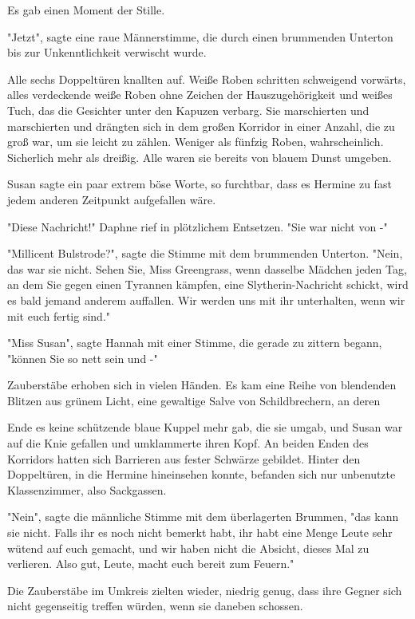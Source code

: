 {Es gab einen Moment der Stille.

"Jetzt", sagte eine raue Männerstimme, die durch einen brummenden Unterton bis zur Unkenntlichkeit verwischt wurde.

Alle sechs Doppeltüren knallten auf. Weiße Roben schritten schweigend vorwärts, alles verdeckende weiße Roben ohne Zeichen der Hauszugehörigkeit und weißes Tuch, das die Gesichter unter den Kapuzen verbarg. Sie marschierten und marschierten und drängten sich in dem großen Korridor in einer Anzahl, die zu groß war, um sie leicht zu zählen. Weniger als fünfzig Roben, wahrscheinlich. Sicherlich mehr als dreißig. Alle waren sie bereits von blauem Dunst umgeben.

Susan sagte ein paar extrem böse Worte, so furchtbar, dass es Hermine zu fast jedem anderen Zeitpunkt aufgefallen wäre.

"Diese Nachricht!" Daphne rief in plötzlichem Entsetzen. "Sie war nicht von -"

"Millicent Bulstrode?", sagte die Stimme mit dem brummenden Unterton. "Nein, das war sie nicht. Sehen Sie, Miss Greengrass, wenn dasselbe Mädchen jeden Tag, an dem Sie gegen einen Tyrannen kämpfen, eine Slytherin-Nachricht schickt, wird es bald jemand anderem auffallen. Wir werden uns mit ihr unterhalten, wenn wir mit euch fertig sind."

"Miss Susan", sagte Hannah mit einer Stimme, die gerade zu zittern begann, "können Sie so nett sein und -"

Zauberstäbe erhoben sich in vielen Händen. Es kam eine Reihe von blendenden Blitzen aus grünem Licht, eine gewaltige Salve von Schildbrechern, an deren

Ende es keine schützende blaue Kuppel mehr gab, die sie umgab, und Susan war auf die Knie gefallen und umklammerte ihren Kopf. An beiden Enden des Korridors hatten sich Barrieren aus fester Schwärze gebildet. Hinter den Doppeltüren, in die Hermine hineinsehen konnte, befanden sich nur unbenutzte Klassenzimmer, also Sackgassen.

"Nein", sagte die männliche Stimme mit dem überlagerten Brummen, "das kann sie nicht. Falls ihr es noch nicht bemerkt habt, ihr habt eine Menge Leute sehr wütend auf euch gemacht, und wir haben nicht die Absicht, dieses Mal zu verlieren. Also gut, Leute, macht euch bereit zum Feuern."

Die Zauberstäbe im Umkreis zielten wieder, niedrig genug, dass ihre Gegner sich nicht gegenseitig treffen würden, wenn sie daneben schossen.

}

